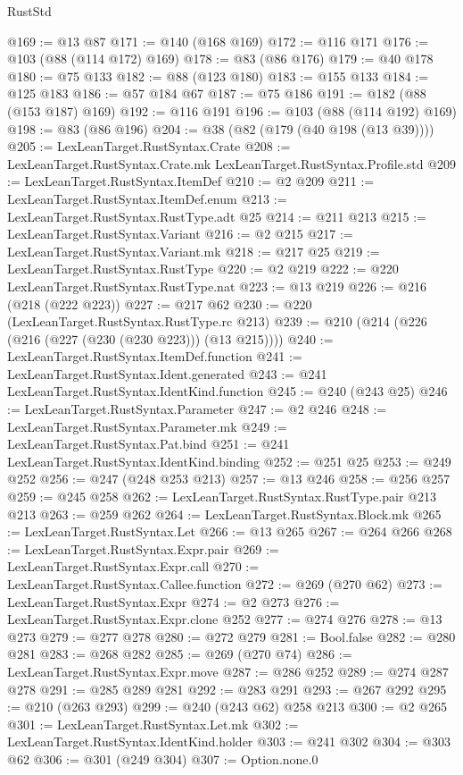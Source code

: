 \begin{lexlean}{RustStd}
\begin{coremodule}
{\begin{coremodule}
{{{{{{{@169 := @13 @87
@171 := @140 (@168 @169)
@172 := @116 @171
@176 := @103 (@88 (@114 @172) @169)
@178 := @83 (@86 @176)
@179 := @40 @178
@180 := @75 @133
@182 := @88 (@123 @180)
@183 := @155 @133
@184 := @125 @183
@186 := @57 @184 @67
@187 := @75 @186
@191 := @182 (@88 (@153 @187) @169)
@192 := @116 @191
@196 := @103 (@88 (@114 @192) @169)
@198 := @83 (@86 @196)
@204 := @38 (@82 (@179 (@40 @198 (@13 @39))))
@205 := LexLeanTarget.RustSyntax.Crate
@208 := LexLeanTarget.RustSyntax.Crate.mk LexLeanTarget.RustSyntax.Profile.std
@209 := LexLeanTarget.RustSyntax.ItemDef
@210 := @2 @209
@211 := LexLeanTarget.RustSyntax.ItemDef.enum
@213 := LexLeanTarget.RustSyntax.RustType.adt @25
@214 := @211 @213
@215 := LexLeanTarget.RustSyntax.Variant
@216 := @2 @215
@217 := LexLeanTarget.RustSyntax.Variant.mk
@218 := @217 @25
@219 := LexLeanTarget.RustSyntax.RustType
@220 := @2 @219
@222 := @220 LexLeanTarget.RustSyntax.RustType.nat
@223 := @13 @219
@226 := @216 (@218 (@222 @223))
@227 := @217 @62
@230 := @220 (LexLeanTarget.RustSyntax.RustType.rc @213)
@239 := @210 (@214 (@226 (@216 (@227 (@230 (@230 @223))) (@13 @215))))
@240 := LexLeanTarget.RustSyntax.ItemDef.function
@241 := LexLeanTarget.RustSyntax.Ident.generated
@243 := @241 LexLeanTarget.RustSyntax.IdentKind.function
@245 := @240 (@243 @25)
@246 := LexLeanTarget.RustSyntax.Parameter
@247 := @2 @246
@248 := LexLeanTarget.RustSyntax.Parameter.mk
@249 := LexLeanTarget.RustSyntax.Pat.bind
@251 := @241 LexLeanTarget.RustSyntax.IdentKind.binding
@252 := @251 @25
@253 := @249 @252
@256 := @247 (@248 @253 @213)
@257 := @13 @246
@258 := @256 @257
@259 := @245 @258
@262 := LexLeanTarget.RustSyntax.RustType.pair @213 @213
@263 := @259 @262
@264 := LexLeanTarget.RustSyntax.Block.mk
@265 := LexLeanTarget.RustSyntax.Let
@266 := @13 @265
@267 := @264 @266
@268 := LexLeanTarget.RustSyntax.Expr.pair
@269 := LexLeanTarget.RustSyntax.Expr.call
@270 := LexLeanTarget.RustSyntax.Callee.function
@272 := @269 (@270 @62)
@273 := LexLeanTarget.RustSyntax.Expr
@274 := @2 @273
@276 := LexLeanTarget.RustSyntax.Expr.clone @252
@277 := @274 @276
@278 := @13 @273
@279 := @277 @278
@280 := @272 @279
@281 := Bool.false
@282 := @280 @281
@283 := @268 @282
@285 := @269 (@270 @74)
@286 := LexLeanTarget.RustSyntax.Expr.move
@287 := @286 @252
@289 := @274 @287 @278
@291 := @285 @289 @281
@292 := @283 @291
@293 := @267 @292
@295 := @210 (@263 @293)
@299 := @240 (@243 @62) @258 @213
@300 := @2 @265
@301 := LexLeanTarget.RustSyntax.Let.mk
@302 := LexLeanTarget.RustSyntax.IdentKind.holder
@303 := @241 @302
@304 := @303 @62
@306 := @301 (@249 @304)
@307 := Option.none.{0}
}}}}}}}
\end{coremodule}}
\end{coremodule}
\end{lexlean}
